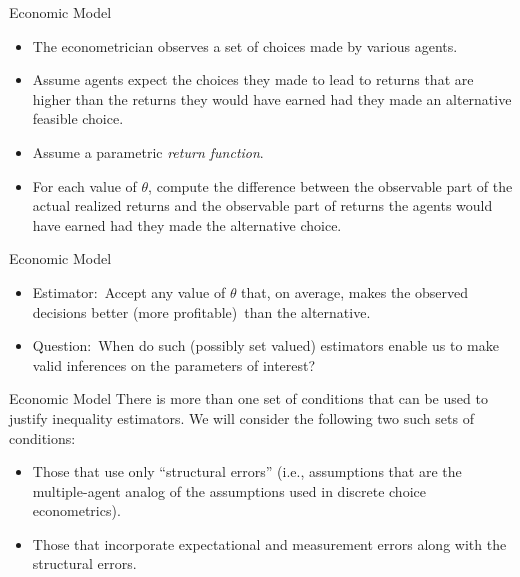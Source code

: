 \documentclass[aspectratio=169,11pt]{beamer}
\begin{document}
\begin{frame}{Economic Model}
\begin{itemize}
\item The econometrician observes a set of choices made by various agents.
\vspace{0.1in}
\item Assume agents expect the choices they made to lead to returns that are
higher than the returns they would have earned had they made an
alternative feasible choice.
\vspace{0.1in}
\item Assume a parametric \textit{return function}.
\vspace{0.1in}
\item For each value of $\theta $, compute the difference between the observable part of the actual realized returns and the observable part of returns the agents would have earned had they made the alternative choice.
\end{itemize}
\end{frame}


\begin{frame}{Economic Model}
\begin{itemize}
\item Estimator:\ Accept any value of $\theta $ that, on average, makes the
observed decisions better (more profitable)\ than the alternative.
\vspace{0.1in}
\item Question:\ When do such (possibly set valued) estimators enable us to
make valid inferences on the parameters of interest?
\end{itemize}
\end{frame}


\begin{frame}{Economic Model}
There is more than one set of conditions that can be used to justify
inequality estimators.  We will consider the following two such sets of conditions:\\
\begin{itemize}
\vspace{0.1in}
\item Those that use only ``structural errors'' (i.e., assumptions
that are the multiple-agent analog of the assumptions used in discrete
choice econometrics). \\
\vspace{0.1in}
\item Those that incorporate expectational and measurement errors along with the structural errors.\\
\end{itemize}
\end{frame}
\end{document}
